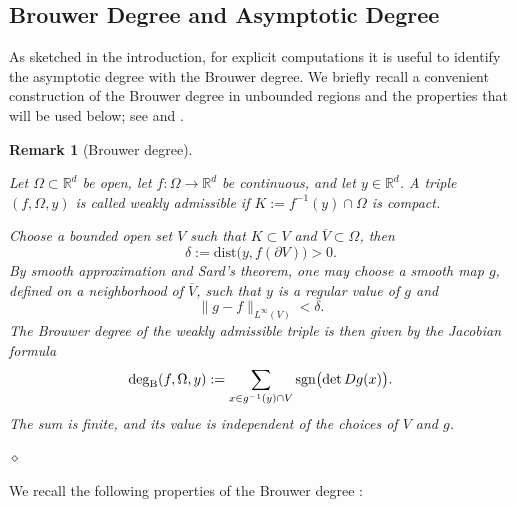 \documentclass[12pt]{amsart}
\newtheorem{remark}[theorem]{Remark}
\newcommand{\RM}{{\mathbb R}}
\newcommand{\sgn}{{\rm sgn}}
\newcommand{\pdv}{\partial}
\begin{document}
\subsection{Brouwer Degree and Asymptotic Degree}
\label{sec:brouwer}

As sketched in the introduction, for explicit computations it is useful to
identify the asymptotic degree with the Brouwer degree. We briefly recall a
convenient construction of the Brouwer degree in unbounded regions and the properties that will be
used below; see
\cite[Definition~3.7, Corollary~3.8, Theorem~3.17, and
Definition~4.1]{BenevieriFuriPeraSpadini2023} and
\cite[Chapter~1]{DincaMawhin2021}.

\begin{remark}[Brouwer degree]\label{rem:brouwer_degree}
{\rm
Let $\Omega\subset\RM^d$ be open, let $f:\Omega\to\RM^d$ be continuous,
and let $y\in\RM^d$. A triple $(f,\Omega,y)$ is called weakly admissible if $K:=f^{-1}(y)\cap\Omega$ is compact.

Choose a bounded open set $V$ such that $K\subset V$ and $\overline V\subset\Omega$, then
\[
    \delta:=\mathrm{dist}\bigl(y,f(\pdv V)\bigr)>0.
\]
By smooth approximation and Sard's theorem, one may choose a smooth map
$g$, defined on a neighborhood of $\overline V$, such that $y$ is a
regular value of $g$ and 
\[ \|g-f\|_{L^\infty(V)}<\delta.\]
The Brouwer degree of the weakly admissible triple is then given
by the Jacobian formula
\begin{equation}\label{eq:brouwer_jacobian_formula}
    \deg_{\mathrm B}(f,\Omega,y)
    :=
    \sum_{x\in g^{-1}(y)\cap V}
    \sgn\bigl(\det Dg(x)\bigr).
\end{equation}
The sum is finite, and its value is independent of the choices of $V$
and $g$.}$\diamond$
\end{remark}

We recall the following properties of the Brouwer degree
\cite[Theorem~3.10 and Theorem~4.2]
{BenevieriFuriPeraSpadini2023}:
\end{document}
